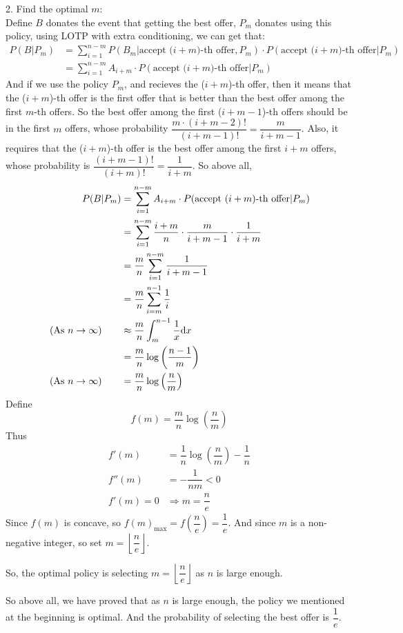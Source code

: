 \begin{homeworkProblem}
2. Find the optimal $m$: \\
Define $B$ donates the event that getting the best offer, $P_m$ donates using this policy, using LOTP with extra conditioning, we can get that:
\begin{align*}
P(B|P_m) &= \sum_{i=1}^{n-m} P(B_m | \text{accept ($i+m$)-th offer}, P_m) \cdot P(\text{accept ($i+m$)-th offer}|P_m) \\
&= \sum_{i=1}^{n-m} A_{i+m} \cdot P(\text{accept ($i+m$)-th offer}|P_m)
\end{align*}
And if we use the policy $P_m$, and recieves the ($i+m$)-th offer, then it means that the ($i+m$)-th offer is the first offer that is better than the best offer among the first $m$-th offers. So the best offer among the first ($i+m-1$)-th offers should be in the first $m$ offers, whose probability $\dfrac{m\cdot (i+m-2)!}{(i+m-1)!}=\dfrac{m}{i+m-1}$. Also, it requires that the ($i+m$)-th offer is the best offer among the first $i+m$ offers, whose probability is $\dfrac{(i+m-1)!}{(i+m)!}=\dfrac{1}{i+m}$. So above all,
\begin{align*}
P(B|P_m) &= \sum_{i=1}^{n-m} A_{i+m} \cdot P(\text{accept ($i+m$)-th offer}|P_m) \\
&= \sum_{i=1}^{n-m} \dfrac{i+m}{n} \cdot \dfrac{m}{i+m-1} \cdot \dfrac{1}{i+m} \\
&= \dfrac{m}{n}\sum_{i=1}^{n-m} \dfrac{1}{i+m-1} \\
&= \dfrac{m}{n}\sum_{i=m}^{n-1}\dfrac{1}{i} \\
\text{(As $n\to\infty$)}\qquad &\approx \dfrac{m}{n} \int_{m}^{n-1} \dfrac{1}{x} \mathrm{d}x \\
&= \dfrac{m}{n} \log \left(\dfrac{n-1}{m}\right) \\
\text{(As $n\to\infty$)}\qquad &= \dfrac{m}{n} \log \left(\dfrac{n}{m}\right)
\end{align*}
Define
$$f(m) = \dfrac{m}{n} \log \left(\dfrac{n}{m}\right)$$
Thus
\begin{align*}
f'(m) &= \dfrac{1}{n} \log \left(\dfrac{n}{m}\right) - \dfrac{1}{n} \\
f''(m) &= -\dfrac{1}{nm} < 0\\
f'(m)=0 &\Rightarrow m=\dfrac{n}{e}
\end{align*}
Since $f(m)$ is concave, so $f(m)_{\max}=f\left(\dfrac{n}{e}\right)=\dfrac{1}{e}$. And since $m$ is a non-negative integer, so set $m=\left\lfloor \dfrac{n}{e} \right\rfloor$.

So, the optimal policy is selecting $m=\left\lfloor \dfrac{n}{e} \right\rfloor$ as $n$ is large enough.

So above all, we have proved that as $n$ is large enough, the policy we mentioned at the beginning is optimal. And the probability of selecting the best offer is $\dfrac{1}{e}$.

\end{homeworkProblem}

\newpage